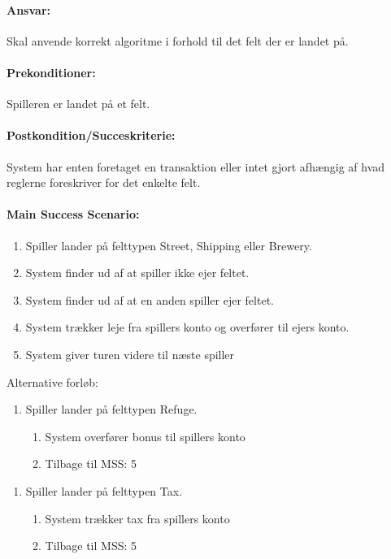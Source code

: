 \paragraph{Ansvar:} 
Skal anvende korrekt algoritme i forhold til det felt der er landet på.
 
\paragraph{Prekonditioner:} 
Spilleren er landet på et felt.

\paragraph{Postkondition/Succeskriterie:}
System har enten foretaget en transaktion eller intet gjort afhængig af hvad reglerne foreskriver for det enkelte felt.

\paragraph{Main Success Scenario:} 

\begin{enumerate}
\item Spiller lander på felttypen Street, Shipping eller Brewery.
\item System finder ud af at spiller ikke ejer feltet.
\item System finder ud af at en anden spiller ejer feltet.
\item System trækker leje fra spillers konto og overfører til ejers konto.
\item System giver turen videre til næste spiller
\end{enumerate}
Alternative forløb:
\begin{enumerate}[1a]
\item Spiller lander på felttypen Refuge.
	\begin{enumerate}[1.]
	\item System overfører bonus til spillers konto
	\item Tilbage til MSS: 5
	\end{enumerate}
\end{enumerate} 
\begin{enumerate}[1b]
\item Spiller lander på felttypen Tax.
	\begin{enumerate}[1.]
	\item System trækker tax fra spillers konto 
	\item Tilbage til MSS: 5
	\end{enumerate}
\end{enumerate} 

